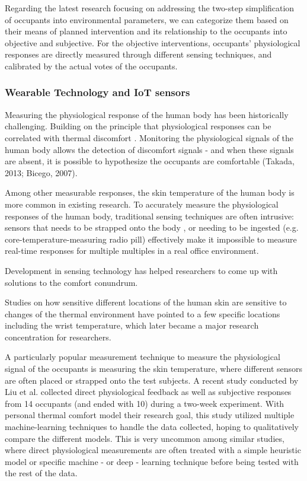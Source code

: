 Regarding the latest research focusing on addressing the two-step simplification of occupants into environmental parameters, we can categorize them based on their means of planned intervention and its relationship to the occupants into objective and subjective. For the objective interventions, occupants' physiological responses are directly measured through different sensing techniques, and calibrated by the actual votes of the occupants. 

\subsubsection{Wearable Technology and IoT sensors}
Measuring the physiological response of the human body has been historically challenging. Building on the principle that physiological responses can be correlated with thermal discomfort \cite{huizenga_skin_2004}. Monitoring the physiological signals of the human body allows the detection of discomfort signals - and when these signals are absent, it is possible to hypothesize the occupants are comfortable (Takada, 2013; Bicego, 2007). \cite{}


Among other measurable responses, the skin temperature of the human body is more common in existing research. To accurately measure the physiological responses of the human body, traditional sensing techniques are often intrusive: sensors that needs to be strapped onto the body \cite{mccarthy_validation_2016}, or needing to be ingested (e.g. core-temperature-measuring radio pill) effectively make it impossible to measure real-time responses for multiple multiples in a real office environment. 

Development in sensing technology has helped researchers to come up with solutions to the comfort conundrum. 

Studies on how sensitive different locations of the human skin are sensitive to changes of the thermal environment have pointed to a few specific locations including the wrist temperature, which later became a major research concentration for researchers\cite{choi_cobi:_2010}. 

A particularly popular measurement technique to measure the physiological signal of the occupants is measuring the skin temperature, where different sensors are often placed or strapped onto the test subjects. A recent study conducted by Liu et al. collected direct physiological feedback as well as subjective responses from 14 occupants (and ended with 10) during a two-week experiment\cite{liu_personal_2019}. With personal thermal comfort model their research goal, this study utilized multiple machine-learning techniques to handle the data collected, hoping to qualitatively compare the different models. This is very uncommon among similar studies, where direct physiological measurements are often treated with a simple heuristic model \cite{garg_smart_2000} or specific machine \cite{anguita_public_2013} - or deep - learning technique before being tested with the rest of the data\cite{kim_personal_2018}. 

